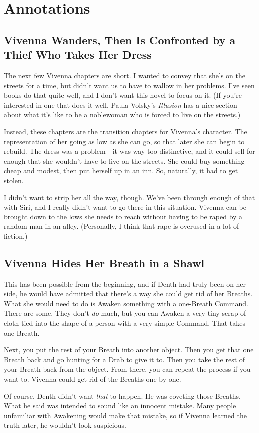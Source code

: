 \section*{Annotations}

\subsection*{Vivenna Wanders, Then Is Confronted by a Thief Who Takes Her Dress}

The next few Vivenna chapters are short. I wanted to convey that she’s on the streets for a time, but didn’t want us to have to wallow in her problems. I’ve seen books do that quite well, and I don’t want this novel to focus on it. (If you’re interested in one that does it well, Paula Volsky’s \textit{Illusion} has a nice section about what it’s like to be a noblewoman who is forced to live on the streets.)

Instead, these chapters are the transition chapters for Vivenna’s character. The representation of her going as low as she can go, so that later she can begin to rebuild. The dress was a problem—it was way too distinctive, and it could sell for enough that she wouldn’t have to live on the streets. She could buy something cheap and modest, then put herself up in an inn. So, naturally, it had to get stolen.

I didn’t want to strip her all the way, though. We’ve been through enough of that with Siri, and I really didn’t want to go there in this situation. Vivenna can be brought down to the lows she needs to reach without having to be raped by a random man in an alley. (Personally, I think that rape is overused in a lot of fiction.)

\subsection*{Vivenna Hides Her Breath in a Shawl}

This has been possible from the beginning, and if Denth had truly been on her side, he would have admitted that there’s a way she could get rid of her Breaths. What she would need to do is Awaken something with a one-Breath Command. There are some. They don’t \textit{do} much, but you can Awaken a very tiny scrap of cloth tied into the shape of a person with a very simple Command. That takes one Breath.

Next, you put the rest of your Breath into another object. Then you get that one Breath back and go hunting for a Drab to give it to. Then you take the rest of your Breath back from the object. From there, you can repeat the process if you want to. Vivenna could get rid of the Breaths one by one.

Of course, Denth didn’t want \textit{that} to happen. He was coveting those Breaths. What he said was intended to sound like an innocent mistake. Many people unfamiliar with Awakening would make that mistake, so if Vivenna learned the truth later, he wouldn’t look suspicious.



